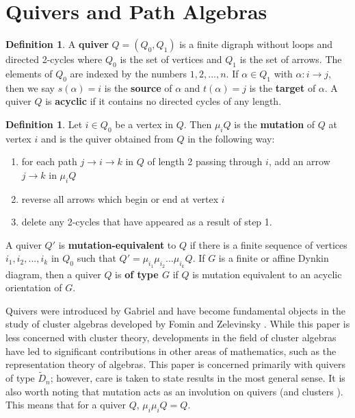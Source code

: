 \documentclass[11pt]{amsart}
\theoremstyle{plain}
\theoremstyle{definition}
\newtheorem{definition}[theorem]{Definition}
\numberwithin{equation}{section}
\begin{document}
\section{Quivers and Path Algebras}

\begin{definition}\label{def-quiver}
    A \textbf{quiver} $Q = (Q_0, Q_1)$ is a finite digraph without loops and directed 2-cycles where $Q_0$ is the set of vertices and $Q_1$ is the set of arrows.
    The elements of $Q_0$ are indexed by the numbers $1, 2, ..., n$. 
    If $\alpha \in Q_1$ with $\alpha: i \to j$, then we say $s(\alpha) = i$ is the \textbf{source} of $\alpha$ and $t(\alpha) = j$ is the \textbf{target} of $\alpha$.
    A quiver $Q$ is \textbf{acyclic} if it contains no directed cycles of any length.
\end{definition}

\begin{definition}
    Let $i \in Q_0$ be a vertex in $Q$. 
    Then $\mu_i Q$ is the \textbf{mutation} of $Q$ at vertex $i$ and is the quiver obtained from $Q$ in the following way:
    \begin{enumerate}
        \item for each path $j \to i \to k$ in $Q$ of length 2 passing through $i$, add an arrow $j \to k$ in $\mu_i Q$
        \item reverse all arrows which begin or end at vertex $i$
        \item delete any 2-cycles that have appeared as a result of step 1.
    \end{enumerate}
    A quiver $Q'$ is \textbf{mutation-equivalent} to $Q$ if there is a finite sequence of vertices $i_1, i_2, ..., i_k$ in $Q_0$ such that $Q' = \mu_{i_1}\mu_{i_2}...\mu_{i_k}Q$.
    If $G$ is a finite or affine Dynkin diagram, then a quiver $Q$ is \textbf{of type $G$} if $Q$ is mutation equivalent to an acyclic orientation of $G$. 
\end{definition}

Quivers were introduced by Gabriel \cite{gabriel_unzerlegbare_1972} and have become fundamental objects in the study of cluster algebras developed by Fomin and Zelevinsky \cite{fomin_cluster_2002,fomin_cluster_2003}.
While this paper is less concerned with cluster theory, developments in the field of cluster algebras have led to significant contributions in other areas of mathematics, such as the representation theory of algebras.
This paper is concerned primarily with quivers of type $\widetilde{D}_n$; however, care is taken to state results in the most general sense.
It is also worth noting that mutation acts as an involution on quivers (and clusters \cite{fomin_cluster_2002}).
This means that for a quiver $Q$, $\mu_i \mu_i Q = Q$.
\end{document}
